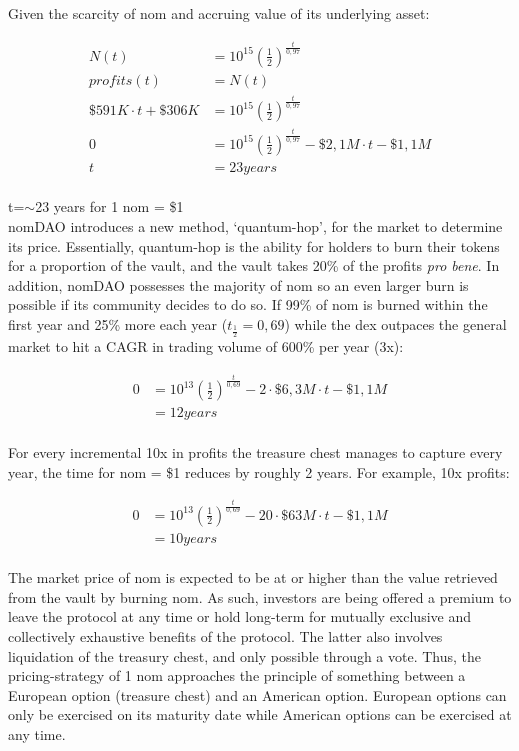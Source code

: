\documentclass[12pt]{article}
\begin{document}
Given the scarcity of nom and accruing value of its underlying asset:

\begin{equation}\label{target}
\begin{split}
N(t) &=10^{15}(\frac{1}{2})^\frac{t}{0,97}\\
profits(t) &=N(t)\\
\$591K \cdot t+ \$306K&=10^{15}(\frac{1}{2})^\frac{t}{0,97}\\
0 &=10^{15}(\frac{1}{2})^\frac{t}{0,97}-\$2,1M \cdot t-\$1,1M\\
t &= 23years
\end{split}
\end{equation}
\\

t=$\sim$23 years for 1 nom = \$1\\
nomDAO introduces a new method, ‘quantum-hop’, for the market to determine its price. Essentially, quantum-hop is the ability for holders to burn their tokens for a proportion of the vault, and the vault takes 20\% of the profits \textit{pro bene}. In addition, nomDAO possesses the majority of nom so an even larger burn is possible if its community decides to do so. If 99\% of nom is burned within the first year and 25\% more each year ($t_{\frac{1}{2}}=0,69$) while the dex outpaces the general market to hit a CAGR in trading volume of 600\% per year (3x):

\begin{equation}\label{2x}
\begin{split}
0 &=10^{13}(\frac{1}{2})^\frac{t}{0,69} - 2 \cdot \$6,3M \cdot t-\$1,1M\\
 &= 12years
\end{split}
\end{equation}
\\

For every incremental 10x in profits the treasure chest manages to capture every year, the time for nom = \$1 reduces by roughly 2 years. For example, 10x profits:

\begin{equation}\label{10x}
\begin{split}
0 &=10^{13}(\frac{1}{2})^\frac{t}{0,69} - 20 \cdot \$63M \cdot t-\$1,1M\\
&= 10years
\end{split}
\end{equation}
\\
The market price of nom is expected to be at or higher than the value retrieved from the vault by burning nom. As such, investors are being offered a premium to leave the protocol at any time or hold long-term for mutually exclusive and collectively exhaustive benefits of the protocol. The latter also involves liquidation of the treasury chest, and only possible through a vote. Thus, the pricing-strategy of 1 nom approaches the principle of something between a European option (treasure chest) and an American option. European options can only be exercised on its maturity date while American options can be exercised at any time.
\end{document}
